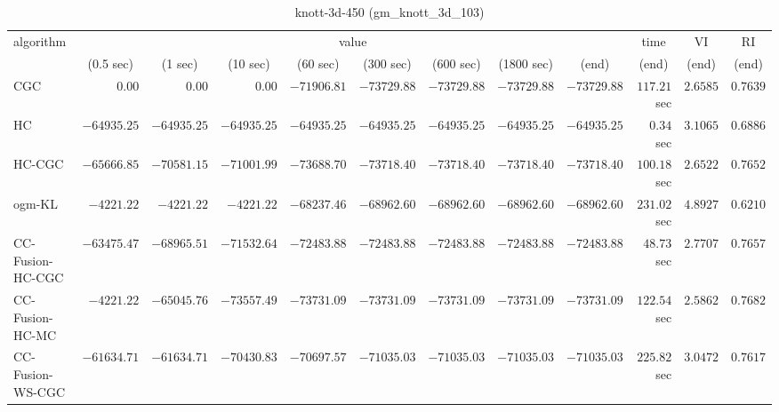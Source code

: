 \begin{table}[H]
\scriptsize
\centering
\caption{knott-3d-450 (gm\_knott\_3d\_103)}
\label{tab:anytimetable-knott-3d-450-gm-knott-3d-103}
\begin{tabular}{lrrrrrrrrrrr}
\toprule
           algorithm &                                   \multicolumn{8}{c}{value} & \multicolumn{1}{c}{time}    & \multicolumn{1}{c}{VI}  & \multicolumn{1}{c}{RI} \\  
\cmidrule(lr){2-9}\cmidrule(lr){10-10} \cmidrule(lr){11-11} \cmidrule(lr){12-12}   
                     & \multicolumn{1}{c}{(0.5 sec)} & \multicolumn{1}{c}{(1 sec)} & \multicolumn{1}{c}{(10 sec)} & \multicolumn{1}{c}{(60 sec)} & \multicolumn{1}{c}{(300 sec)} & \multicolumn{1}{c}{(600 sec)} & \multicolumn{1}{c}{(1800 sec)} & \multicolumn{1}{c}{(end)} & \multicolumn{1}{c}{(end)}    & \multicolumn{1}{c}{(end)}   & \multicolumn{1}{c}{(end)}  \\ \midrule 
                 CGC & $         0.00$ & $         0.00$ & $         0.00$ & $    -71906.81$ & $    -73729.88$ & $    -73729.88$ & $    -73729.88$ & $    -73729.88$ & $       117.21$ sec    & $       2.6585$  & $       0.7639$ \\ 
                  HC & $    -64935.25$ & $    -64935.25$ & $    -64935.25$ & $    -64935.25$ & $    -64935.25$ & $    -64935.25$ & $    -64935.25$ & $    -64935.25$ & $         0.34$ sec    & $       3.1065$  & $       0.6886$ \\ 
              HC-CGC & $    -65666.85$ & $    -70581.15$ & $    -71001.99$ & $    -73688.70$ & $    -73718.40$ & $    -73718.40$ & $    -73718.40$ & $    -73718.40$ & $       100.18$ sec    & $       2.6522$  & $       0.7652$ \\ 
              ogm-KL & $     -4221.22$ & $     -4221.22$ & $     -4221.22$ & $    -68237.46$ & $    -68962.60$ & $    -68962.60$ & $    -68962.60$ & $    -68962.60$ & $       231.02$ sec    & $       4.8927$  & $       0.6210$ \\ 
    CC-Fusion-HC-CGC & $    -63475.47$ & $    -68965.51$ & $    -71532.64$ & $    -72483.88$ & $    -72483.88$ & $    -72483.88$ & $    -72483.88$ & $    -72483.88$ & $        48.73$ sec    & $       2.7707$  & $       0.7657$ \\ 
     CC-Fusion-HC-MC & $     -4221.22$ & $    -65045.76$ & $    -73557.49$ & $    -73731.09$ & $    -73731.09$ & $    -73731.09$ & $    -73731.09$ & $    -73731.09$ & $       122.54$ sec    & $       2.5862$  & $       0.7682$ \\ 
    CC-Fusion-WS-CGC & $    -61634.71$ & $    -61634.71$ & $    -70430.83$ & $    -70697.57$ & $    -71035.03$ & $    -71035.03$ & $    -71035.03$ & $    -71035.03$ & $       225.82$ sec    & $       3.0472$  & $       0.7617$ \\ 

\end{tabular}
\end{table}
